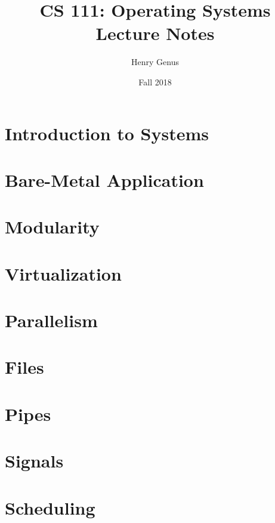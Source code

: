 \documentclass[10pt]{article}
\title{%
	CS 111: Operating Systems\\
	Lecture Notes}
\author{Henry Genus}
\date{Fall 2018}
\begin{document}
{
\setlength{\parskip}{0em}
\maketitle
\newpage
\tableofcontents
\newpage
}


\section{Introduction to Systems}


\section{Bare-Metal Application}


\section{Modularity}


\section{Virtualization}


\section{Parallelism}


\section{Files}


\section{Pipes}


\section{Signals}


\section{Scheduling}

\end{document}
